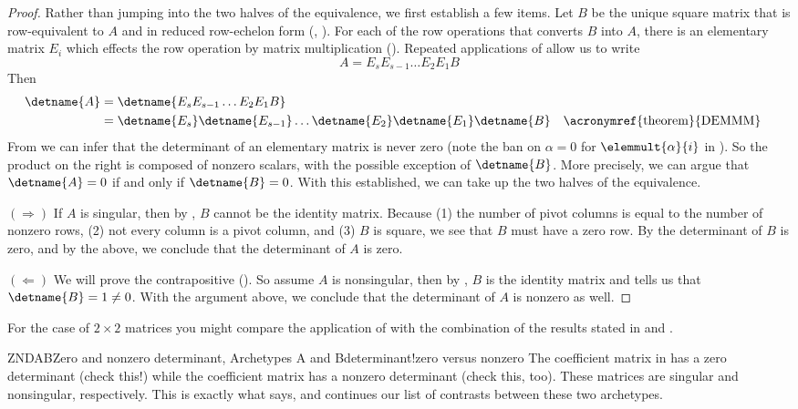\begin{proof}
Rather than jumping into the two halves of the equivalence, we first establish a few items.  Let $B$ be the unique square matrix that is row-equivalent to $A$ and in reduced row-echelon form (, ).  For each of the row operations that converts $B$ into $A$, there is an elementary matrix $E_i$ which effects the row operation by matrix multiplication ().  Repeated applications of  allow us to write
%
\begin{equation*}
A=E_sE_{s-1}\dots E_2E_1B
\end{equation*}
%
Then
%
\begin{align*}
\detname{A}
&=
\detname{E_sE_{s-1}\dots E_2E_1B}\\
%
&=\detname{E_s}\detname{E_{s-1}}\dots\detname{E_2}\detname{E_1}\detname{B}
&&\text{\acronymref{theorem}{DEMMM}}
%
\end{align*}
%
From  we can infer that the determinant of an elementary matrix is never zero (note the ban on $\alpha=0$ for $\elemmult{\alpha}{i}$ in ).  So the product on the right is composed of nonzero scalars, with the possible exception of $\detname{B}$.  More precisely, we can argue that $\detname{A}=0$ if and only if $\detname{B}=0$.  With this established, we can take up the two halves of the equivalence.\par
%
$(\Rightarrow)$\quad
If $A$ is singular, then by , $B$ cannot be the identity matrix.  Because (1) the number of pivot columns is equal to the number of nonzero rows, (2) not every column is a pivot column, and (3) $B$ is square, we see that $B$ must have a zero row.  By  the determinant of $B$ is zero, and by the above, we conclude that the determinant of $A$ is zero.\par
%
$(\Leftarrow)$\quad
We will prove the contrapositive ().  So assume $A$ is nonsingular, then by  , $B$ is the identity matrix and  tells us that $\detname{B}=1\neq 0$.  With the argument above, we conclude that the determinant of $A$ is nonzero as well.
%
\end{proof}
%
For the case of $2\times 2$ matrices you might compare the application of  with the combination of the results stated in  and .
%
\begin{example}{ZNDAB}{Zero and nonzero determinant, Archetypes A and B}{determinant!zero versus nonzero}
The coefficient matrix in  has a zero determinant (check this!) while the coefficient matrix  has a nonzero determinant (check this, too).  These matrices are singular and nonsingular, respectively.  This is exactly what  says, and continues our list of contrasts between these two archetypes.
\end{example}
